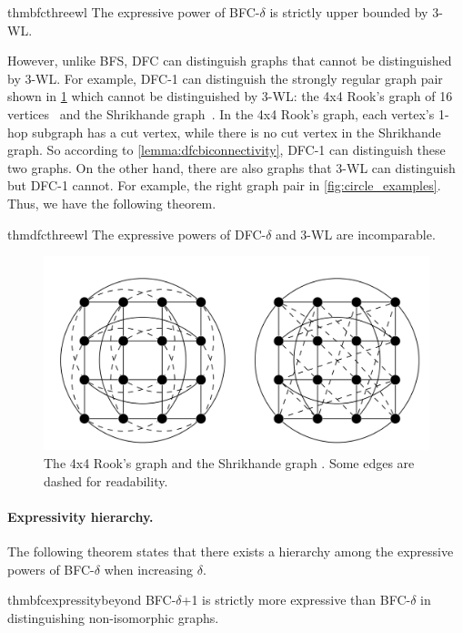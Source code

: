 \begin{restatable}[]{thm}{bfcthreewl}
\label{thm:bfc3wl}
The expressive power of BFC-$\delta$ is strictly upper bounded by 3-WL.
\end{restatable}

However, unlike BFS, DFC can distinguish graphs that cannot be distinguished by 3-WL. For example, DFC-1 can distinguish the strongly regular graph pair shown in \cref{fig:rook_shrikhande} which cannot be distinguished by 3-WL: the 4x4 Rook's graph of 16 vertices~\citep{Wagon_Weisstein} and the Shrikhande graph~\citep{Shrikhande_graph}. In the 4x4 Rook's graph, each vertex's 1-hop subgraph has a cut vertex, while there is no cut vertex in the Shrikhande graph. So according to \cref{lemma:dfcbiconnectivity}, DFC-1 can distinguish these two graphs. On the other hand, there are also graphs that 3-WL can distinguish but DFC-1 cannot. For example, the right graph pair in \cref{fig:circle_examples}. Thus, we have the following theorem.

\begin{restatable}[]{thm}{dfcthreewl}
\label{thm:dfc3wl}
The expressive powers of DFC-$\delta$ and 3-WL are incomparable.
\end{restatable}


\begin{figure}[h]
\centering
\includegraphics[clip,width=0.75\columnwidth]{figures/Shrikhande_Rook_graph.png}
\caption{The 4x4 Rook’s graph and the Shrikhande graph \citet{ARVIND202042}. Some edges are dashed for readability.}
\label{fig:rook_shrikhande}
\end{figure}

\paragraph{Expressivity hierarchy.} The following theorem states that there exists a hierarchy among the expressive powers of BFC-$\delta$ when increasing $\delta$.

\begin{restatable}[]{thm}{bfcexpressitybeyond}
\label{thm:bfcexpressitybeyond}
BFC-$\delta$+1 is strictly more expressive than BFC-$\delta$ in distinguishing non-isomorphic graphs.
\end{restatable}

